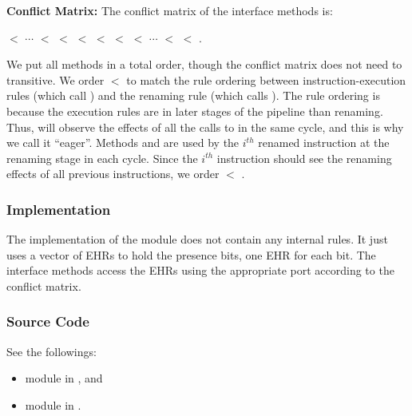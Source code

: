 \noindent\textbf{Conflict Matrix:}
The conflict matrix of the interface methods is:
\begin{center}
     $<$ $\cdots$ $<$  $<$  $<$  $<$  $<$  $<$ $\cdots$ $<$  $<$ .
\end{center}
We put all methods in a total order, though the conflict matrix does not need to transitive.
We order  $<$  to match the rule ordering between instruction-execution rules (which call ) and the renaming rule (which calls ).
The rule ordering is because the execution rules are in later stages of the pipeline than renaming.
Thus,  will observe the effects of all the calls to  in the same cycle, and this is why we call it ``eager''.
Methods  and  are used by the $i^{th}$ renamed instruction at the renaming stage in each cycle.
Since the $i^{th}$ instruction should see the renaming effects of all previous instructions, we order  $<$ .

\subsubsection{Implementation}
The implementation of the module does not contain any internal rules.
It just uses a vector of EHRs to hold the presence bits, one EHR for each bit.
The interface methods access the EHRs using the appropriate port according to the conflict matrix.

\subsubsection{Source Code}
See the followings:
\begin{itemize}
    \item module  in , and
    \item module  in .
\end{itemize}
  
